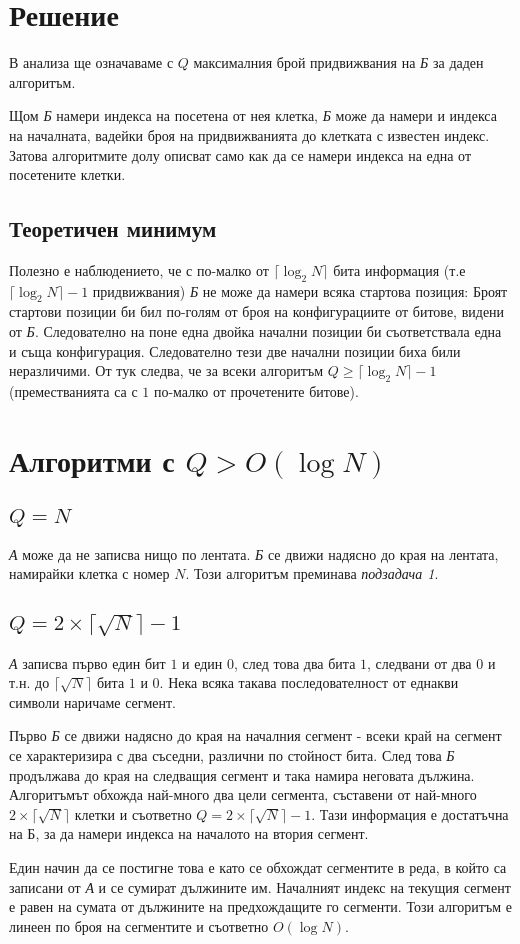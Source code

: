 \documentclass[a4paper,11pt]{article}
\begin{document}
\section{Решение}
В анализа ще означаваме с $Q$ максималния брой придвижвания на \textit{Б} за
даден алгоритъм.

Щом \textit{Б} намери индекса на посетена от нея клетка, \textit{Б} може да
намери и индекса на началната, вадейки броя на придвижванията до клетката с
известен индекс.
Затова алгоритмите долу описват само как да се намери индекса на една от
посетените клетки.

\subsection{Теоретичен минимум}
Полезно е наблюдението, че с по-малко от $\lceil \log_2{N} \rceil $ бита
информация
(т.е $\lceil \log_2{N} \rceil- 1$ придвижвания)
\textit{Б} не може да намери всяка стартова позиция: 
Броят стартови позиции би бил по-голям от броя на конфигурациите от битове,
видени от \textit{Б}.
Следователно на поне една двойка начални позиции би съответствала една и съща
конфигурация.
Следователно тези две начални позиции биха били неразличими.
От тук следва, че за всеки алгоритъм $Q \geq \lceil \log_2{N} \rceil - 1$
(преместванията са с $1$ по-малко от прочетените битове).

\section{Алгоритми с $Q > O(\log{N})$}
\subsection{$Q=N$}
\textit{А} може да не записва нищо по лентата.
\textit{Б} се движи надясно до края на лентата, намирайки клетка с номер $N$. 
Този алгоритъм преминава \textit{подзадача 1}.
\subsection{$Q=2\times \lceil \sqrt{N} \rceil - 1$}
\textit{А} записва първо един бит $1$ и един $0$, след това два бита $1$,
следвани от два $0$ и т.н. до $\lceil \sqrt{N} \rceil$ бита $1$ и $0$.
Нека всяка такава последователност от еднакви символи наричаме сегмент. 

Първо \textit{Б} се движи надясно до края на началния сегмент - всеки край на
сегмент се характеризира с два съседни, различни по стойност бита.
След това \textit{Б} продължава до края на следващия сегмент и така намира
неговата дължина.
Алгоритъмът обхожда най-много два цели сегмента, съставени от най-много 
$2 \times \lceil \sqrt{N} \rceil$ клетки и съответно 
$Q = 2 \times \lceil \sqrt{N} \rceil - 1$.
Тази информация е достатъчна на Б, за да намери индекса на началото на втория
сегмент.

Един начин да се постигне това е като се обхождат сегментите в реда, в който са
записани от \textit{А} и се сумират дължините им.
Началният индекс на текущия сегмент е равен на сумата от дължините на
предхождащите го сегменти.
Този алгоритъм е линеен по броя на сегментите и съответно $O(\log{N})$.  
\end{document}
